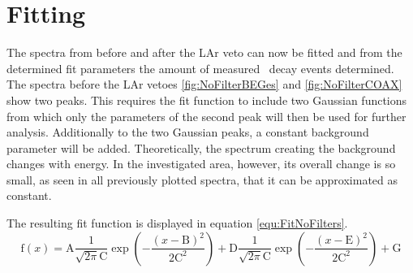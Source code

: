 \documentclass[encoding=utf8,british]{tumphthesis}
\begin{document}
\section{Fitting}
\label{sec:Fitting}

The spectra from before and after the LAr veto can now be fitted and from the determined fit parameters the amount of measured \Kr\ decay events determined.
\\

The spectra before the LAr vetoes \ref{fig:NoFilterBEGes} and \ref{fig:NoFilterCOAX} show two peaks.
This requires the fit function to include two Gaussian functions from which only the parameters of the second peak will then be used for further analysis.
Additionally to the two Gaussian peaks, a constant background parameter will be added.
Theoretically, the  spectrum creating the background changes with energy.
In the investigated area, however, its overall change is so small, as seen in all previously plotted spectra, that it can be approximated as constant. 

The resulting fit function is displayed in equation \ref{equ:FitNoFilters}.
\\

\begin{equation}
\mathrm{f}(x) = \mathrm{A}\frac{1}{\sqrt{2\pi}\mathrm{C}}\exp\left(-\frac{(x-\mathrm{B})^2}{2\mathrm{C}^2}\right) + \mathrm{D}\frac{1}{\sqrt{2\pi}\mathrm{C}}\exp\left(-\frac{(x-\mathrm{E})^2}{2\mathrm{C}^2}\right) + \mathrm{G}
\label{equ:FitNoFilters}
\end{equation}
\\
\end{document}
